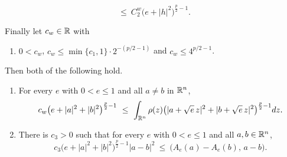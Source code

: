 \begin{helper}
\begin{enumerate}
\[  \ \le\ C_2^{w}\bigl(e+|h|^2\bigr)^{\frac p2-1}.
  \]
\end{enumerate}
Finally let $c_w\in\mathbb{R}$ with
\begin{enumerate}
\item[(H10)] $0<c_w$, $c_w\le\min\{c_1,1\}\cdot2^{-(p/2-1)}$ and
  $c_w\le4^{p/2-1}$.
\end{enumerate}
Then both of the following hold.
\begin{enumerate}
\item[(i)] For every $e$ with $0<e\le1$ and all $a\ne b$ in $\mathbb{R}^n$,
  \[
  c_w\bigl(e+|a|^2+|b|^2\bigr)^{\frac p2-1}
  \ \le\ \int_{\mathbb{R}^n}\rho(z)\bigl(|a+\sqrt e\,z|^2+|b+\sqrt e\,z|^2\bigr)^{\frac p2-1}dz .
  \]
\item[(ii)] There is $c_3>0$ such that for every $e$ with $0<e\le1$ and all
  $a,b\in\mathbb{R}^n$,
  \[
  c_3\bigl(e+|a|^2+|b|^2\bigr)^{\frac p2-1}|a-b|^2
  \ \le\ \bigl(A_e(a)-A_e(b),\,a-b\bigr).
  \]
\end{enumerate}
\end{helper}

